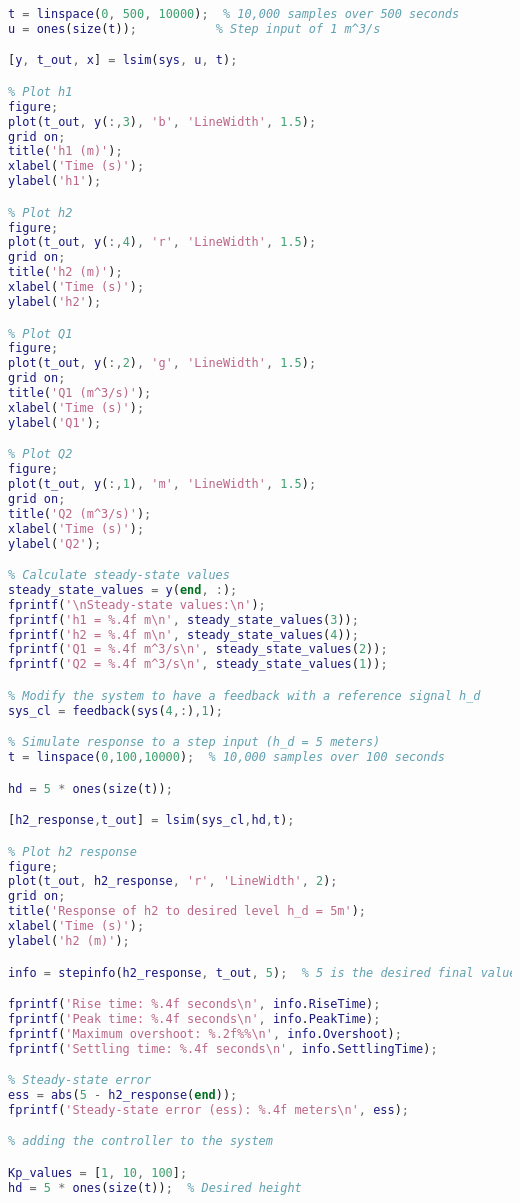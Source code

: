 \documentclass{report}
\begin{document}
\begin{flushleft}
\begin{lstlisting}[language=Matlab, caption=project code,label=lst:code]
% Simulate response to a step input (1 m^3/s)
t = linspace(0, 500, 10000);  % 10,000 samples over 500 seconds
u = ones(size(t));           % Step input of 1 m^3/s

[y, t_out, x] = lsim(sys, u, t);

% Plot h1
figure;
plot(t_out, y(:,3), 'b', 'LineWidth', 1.5);
grid on;
title('h1 (m)');
xlabel('Time (s)');
ylabel('h1');

% Plot h2
figure;
plot(t_out, y(:,4), 'r', 'LineWidth', 1.5);
grid on;
title('h2 (m)');
xlabel('Time (s)');
ylabel('h2');

% Plot Q1
figure;
plot(t_out, y(:,2), 'g', 'LineWidth', 1.5);
grid on;
title('Q1 (m^3/s)');
xlabel('Time (s)');
ylabel('Q1');

% Plot Q2
figure;
plot(t_out, y(:,1), 'm', 'LineWidth', 1.5);
grid on;
title('Q2 (m^3/s)');
xlabel('Time (s)');
ylabel('Q2');

% Calculate steady-state values
steady_state_values = y(end, :);
fprintf('\nSteady-state values:\n');
fprintf('h1 = %.4f m\n', steady_state_values(3));
fprintf('h2 = %.4f m\n', steady_state_values(4));
fprintf('Q1 = %.4f m^3/s\n', steady_state_values(2));
fprintf('Q2 = %.4f m^3/s\n', steady_state_values(1));

% Modify the system to have a feedback with a reference signal h_d
sys_cl = feedback(sys(4,:),1);

% Simulate response to a step input (h_d = 5 meters)
t = linspace(0,100,10000);  % 10,000 samples over 100 seconds

hd = 5 * ones(size(t));

[h2_response,t_out] = lsim(sys_cl,hd,t);

% Plot h2 response
figure;
plot(t_out, h2_response, 'r', 'LineWidth', 2);
grid on;
title('Response of h2 to desired level h_d = 5m');
xlabel('Time (s)');
ylabel('h2 (m)');

info = stepinfo(h2_response, t_out, 5);  % 5 is the desired final value

fprintf('Rise time: %.4f seconds\n', info.RiseTime);
fprintf('Peak time: %.4f seconds\n', info.PeakTime);
fprintf('Maximum overshoot: %.2f%%\n', info.Overshoot);
fprintf('Settling time: %.4f seconds\n', info.SettlingTime);

% Steady-state error
ess = abs(5 - h2_response(end));
fprintf('Steady-state error (ess): %.4f meters\n', ess);

% adding the controller to the system

Kp_values = [1, 10, 100];
hd = 5 * ones(size(t));  % Desired height


\end{lstlisting}
\end{flushleft}
\end{document}
